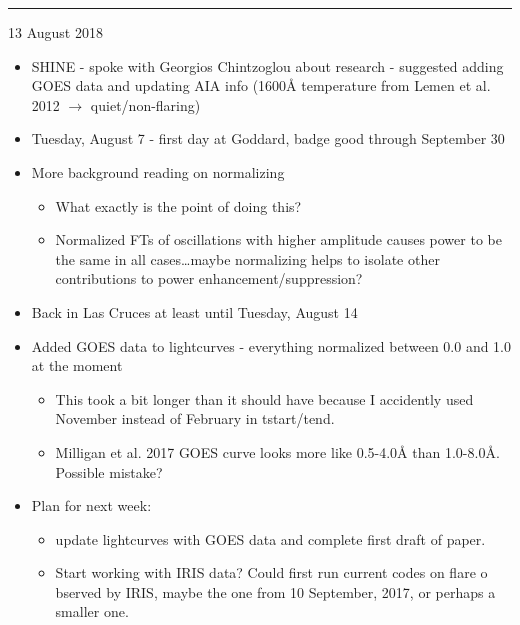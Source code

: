 \documentclass[]{article}
\newcommand{\mydate}[1]{\hrule\vspace{-1mm}\hfill{\small\color{blue}#1}}
\begin{document}
\clearpage
\mydate{13 August 2018}

\begin{itemize}
    \item SHINE - spoke with Georgios Chintzoglou about research - suggested
        adding GOES data and updating AIA info (1600\AA{} temperature from Lemen
        et al. 2012 $\rightarrow$ quiet/non-flaring)
    \item Tuesday, August 7 - first day at
        Goddard, badge good through September 30
    \item More background reading on normalizing
        \begin{itemize}
            \item What exactly is the point of doing this?
            \item Normalized FTs of oscillations with higher amplitude causes
                power to be the same in all cases\ldots maybe normalizing helps to
                isolate other contributions to power enhancement/suppression?
        \end{itemize}
    \item Back in Las Cruces at least until Tuesday, August 14
    \item Added GOES data to lightcurves - everything normalized between 0.0
        and 1.0 at the moment
        \begin{itemize}
            \item This took a bit longer than it should have because I
                accidently used November instead of February in tstart/tend.
            \item Milligan et al. 2017 GOES curve looks more
                like 0.5-4.0\AA{} than 1.0-8.0\AA{}. Possible mistake?
        \end{itemize}
    \item Plan for next week:
        \begin{itemize}
            \item update lightcurves with GOES data and complete first draft of
                paper.
            \item Start working with IRIS data? Could first run current
                codes on flare o bserved by IRIS, maybe the one from 10
                September, 2017, or perhaps a smaller one.
        \end{itemize}
\end{itemize}

\end{document}

